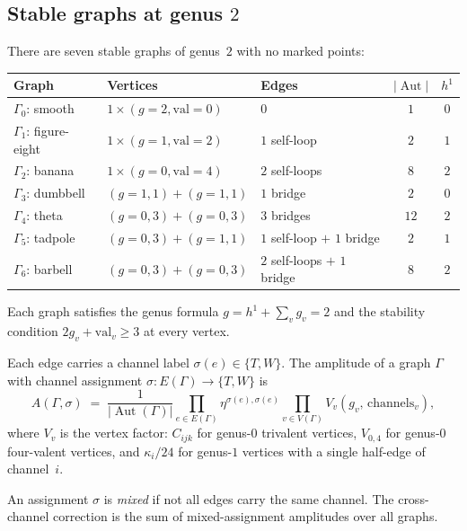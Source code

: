 \documentclass[11pt]{article}
\theoremstyle{plain}
\theoremstyle{definition}
\theoremstyle{remark}
\DeclareMathOperator{\Aut}{Aut}
\begin{document}
\subsection{Stable graphs at genus $2$}

There are seven stable graphs of genus~$2$ with no marked
points:

\begin{center}
\renewcommand{\arraystretch}{1.2}
\small
\begin{tabular}{lllcc}
\toprule
Graph & Vertices & Edges & $|\Aut|$ & $h^1$ \\
\midrule
$\Gamma_0$: smooth &
 $1 \times (g{=}2, \text{val}=0)$ &
 $0$ & $1$ & $0$ \\
$\Gamma_1$: figure-eight &
 $1 \times (g{=}1, \text{val}=2)$ &
 $1$ self-loop & $2$ & $1$ \\
$\Gamma_2$: banana &
 $1 \times (g{=}0, \text{val}=4)$ &
 $2$ self-loops & $8$ & $2$ \\
$\Gamma_3$: dumbbell &
 $(g{=}1,1) + (g{=}1,1)$ &
 $1$ bridge & $2$ & $0$ \\
$\Gamma_4$: theta &
 $(g{=}0,3) + (g{=}0,3)$ &
 $3$ bridges & $12$ & $2$ \\
$\Gamma_5$: tadpole &
 $(g{=}0,3) + (g{=}1,1)$ &
 $1$ self-loop $+$ $1$ bridge & $2$ & $1$ \\
$\Gamma_6$: barbell &
 $(g{=}0,3) + (g{=}0,3)$ &
 $2$ self-loops $+$ $1$ bridge & $8$ & $2$ \\
\bottomrule
\end{tabular}
\end{center}

\noindent Each graph satisfies the genus formula
$g = h^1 + \sum_v g_v = 2$ and the stability condition
$2g_v + \text{val}_v \geq 3$ at every vertex.

Each edge carries a channel label $\sigma(e) \in \{T, W\}$.
The amplitude of a graph $\Gamma$ with channel assignment
$\sigma\colon E(\Gamma) \to \{T, W\}$ is
\begin{equation}\label{eq:feynman-rule}
 A(\Gamma, \sigma)
 \;=\;
 \frac{1}{|\Aut(\Gamma)|}
 \prod_{e \in E(\Gamma)} \eta^{\sigma(e),\sigma(e)}
 \prod_{v \in V(\Gamma)} V_v(g_v,\, \text{channels}_v),
\end{equation}
where $V_v$ is the vertex factor: $C_{ijk}$ for genus-$0$
trivalent vertices, $V_{0,4}$ for genus-$0$ four-valent
vertices, and $\kappa_i/24$ for genus-$1$ vertices with
a single half-edge of channel~$i$.

An assignment $\sigma$ is \emph{mixed} if not all edges
carry the same channel. The cross-channel correction is
the sum of mixed-assignment amplitudes over all graphs.
\end{document}
